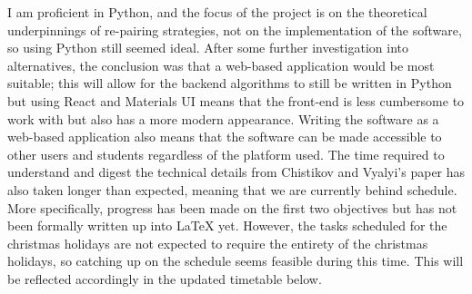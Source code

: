 \documentclass[a4paper]{article}
\begin{document}
	I am proficient in Python, and the focus of the project is on the theoretical underpinnings of re-pairing strategies, not on the implementation of the software, so using Python still seemed ideal. After some further investigation into alternatives, the conclusion was that a web-based application would be most suitable; this will allow for the backend algorithms to still be written in Python but using React and Materials UI means that the front-end is less cumbersome to work with but also has a more modern appearance. Writing the software as a web-based application also means that the software can be made accessible to other users and students regardless of the platform used.
	\newline
	\newline
	The time required to understand and digest the technical details from Chistikov and Vyalyi's paper has also taken longer than expected, meaning that we are currently behind schedule. More specifically, progress has been made on the first two objectives but has not been formally written up into LaTeX yet. However, the tasks scheduled for the christmas holidays are not expected to require the entirety of the christmas holidays, so catching up on the schedule seems feasible during this time. This will be reflected accordingly in the updated timetable below.
		
\end{document}
